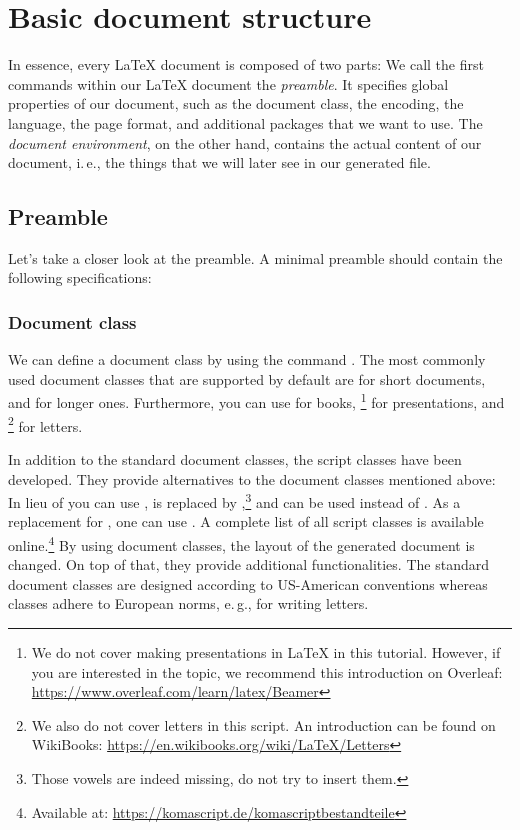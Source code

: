 \chapter{Basic document structure}
\label{sec:basic-document-structure}

In essence, every \LaTeX{} document is composed of two parts: 
We call the first commands within our \LaTeX{} document the \emph{preamble}.
It specifies global properties of our document, such as the document class, the encoding, the language, the page format, and additional packages that we want to use.
The \emph{document environment}, on the other hand, contains the actual content of our document, i.\,e., the things that we will later see in our generated  file. 


\section{Preamble}
Let's take a closer look at the preamble. 
A minimal preamble should contain the following specifications: 

\subsection{Document class}\label{sec:document-class}
We can define a document class by using the command .
The most commonly used document classes that are supported by default are  for short documents, and  for longer ones. 
Furthermore, you can use  for books, \footnote{We do not cover making presentations in \LaTeX{} in this tutorial. However, if you are interested in the topic, we recommend this introduction on Overleaf: \url{https://www.overleaf.com/learn/latex/Beamer}} for presentations, and \footnote{We also do not cover letters in this script. An introduction can be found on WikiBooks: \url{https://en.wikibooks.org/wiki/LaTeX/Letters}} for letters.

In addition to the standard document classes, the  script classes have been developed. 
They provide alternatives to the document classes mentioned above: 
In lieu of  you can use ,  is replaced by ,\footnote{Those vowels are indeed missing, do not try to insert them.} and  can be used instead of . 
As a replacement for , one can use . 
A complete list of all  script classes is available online.\footnote{Available at: \url{https://komascript.de/komascriptbestandteile}} 
By using  document classes, the layout of the generated  document is changed. 
On top of that, they provide additional functionalities. 
The standard document classes are designed according to US-American conventions
whereas  classes adhere to European norms, e.\,g., for 
writing letters. 

